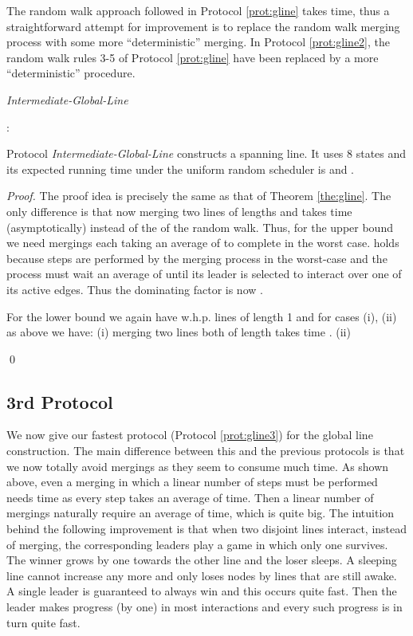 \documentclass[oribibl, 11pt]{llncs}
\begin{document}
The random walk approach followed in Protocol \ref{prot:gline} takes time, thus a straightforward attempt for improvement is to replace the random walk merging process with some more ``deterministic'' merging. In Protocol \ref{prot:gline2}, the random walk rules 3-5 of Protocol \ref{prot:gline} have been replaced by a more ``deterministic'' procedure.  

\renewcommand{\algorithmiccomment}[1]{// #1}
\begin{algorithm}[!h]
  \caption{\emph{Intermediate-Global-Line}}\label{prot:gline2}
  \begin{algorithmic}
    \medskip
    \State 
    \State : 
    
  \end{algorithmic}
\end{algorithm}

\begin{theorem} \label{the:gline2}
Protocol \emph{Intermediate-Global-Line} constructs a spanning line. It uses 8 states and its expected running time under the uniform random scheduler is  and .
\end{theorem}
\begin{proof}
The proof idea is precisely the same as that of Theorem \ref{the:gline}. The only difference is that now merging two lines of lengths  and  takes time  (asymptotically) instead of the  of the random walk. Thus, for the upper bound we need  mergings each taking an average of  to complete in the worst case.  holds because  steps are performed by the merging process in the worst-case and the process must wait an average of  until its leader is selected to interact over one of its active edges. Thus the dominating factor is now .

For the lower bound we again have w.h.p.  lines of length 1 and for cases (i), (ii) as above we have: (i) merging two lines both of length  takes time . (ii)

\qed
\end{proof}

\subsection{3rd Protocol}
\label{subsec:third-line}

We now give our fastest protocol (Protocol \ref{prot:gline3}) for the global line construction. The main difference between this and the previous protocols is that we now totally avoid mergings as they seem to consume much time. As shown above, even a merging in which a linear number of steps must be performed needs  time as every step takes an average of  time. Then a linear number of mergings naturally require an average of  time, which is quite big. The intuition behind the following improvement is that when two disjoint lines interact, instead of merging, the corresponding leaders play a game in which only one survives. The winner grows by one towards the other line and the loser sleeps. A sleeping line cannot increase any more and only loses nodes by lines that are still awake. A single leader is guaranteed to always win and this occurs quite fast. Then the leader makes progress (by one) in most interactions and every such progress is in turn quite fast.
\end{document}
